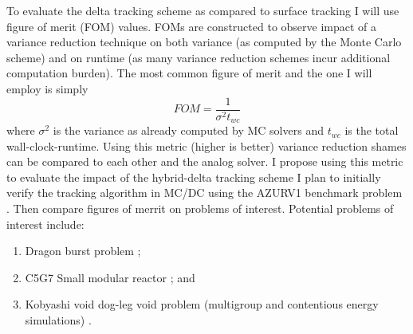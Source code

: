 To evaluate the delta tracking scheme as compared to surface tracking I will use figure of merit (FOM) values.
FOMs are constructed to observe impact of a variance reduction technique on both variance (as computed by the Monte Carlo scheme) and on runtime (as many variance reduction schemes incur additional computation burden).
The most common figure of merit and the one I will employ is simply
\begin{equation}
    FOM = \frac{1}{\sigma^2 t_{wc}}
\end{equation}
where $\sigma^2$ is the variance as already computed by MC solvers and $t_{wc}$ is the total wall-clock-runtime.
Using this metric (higher is better) variance reduction shames can be compared to each other and the analog solver.
I propose using this metric to evaluate the impact of the hybrid-delta tracking scheme 
I plan to initially verify the tracking algorithm in MC/DC using the AZURV1 benchmark problem \cite{ganapol_homogeneous_2001}.
Then compare figures of merrit on problems of interest.
Potential problems of interest include:
\begin{enumerate}
    \item Dragon burst problem \cite{kimpland2021dragon};
    \item C5G7 Small modular reactor \cite{jia_hou_oecdnea_2017}; and
    \item Kobyashi void dog-leg void problem (multigroup and contentious energy simulations) \cite{Kobayashi2001}.
\end{enumerate}